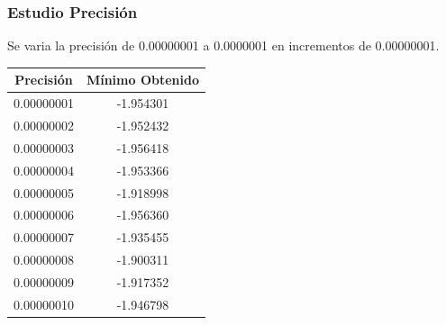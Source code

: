 \documentclass[12pt]{article}
\begin{document}
\subsubsection*{Estudio Precisión}
	Se varia la precisión de 0.00000001 a 0.0000001 en incrementos de 0.00000001.
\begin{table}[H]
\begin{center}
\begin{tabular}{|cc|} \hline
Precisión & Mínimo Obtenido \\  \hline
0.00000001 & -1.954301 \\ 
0.00000002 & -1.952432 \\ 
0.00000003 & -1.956418 \\
0.00000004 & -1.953366 \\
0.00000005 & -1.918998 \\
0.00000006 & -1.956360 \\
0.00000007 & -1.935455 \\
0.00000008 & -1.900311 \\ 
0.00000009 & -1.917352 \\
0.00000010 & -1.946798 \\  \hline
\end{tabular}
\end{center}
\end{table}
\end{document}
